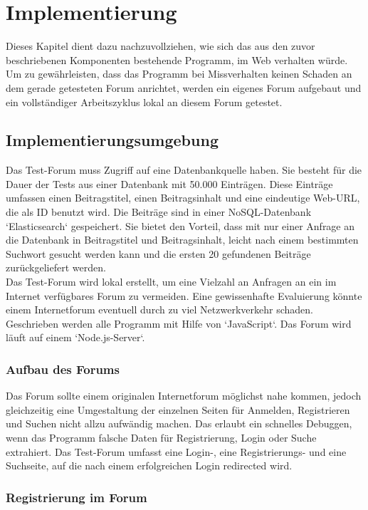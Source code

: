 \section{Implementierung}
Dieses Kapitel dient dazu nachzuvollziehen, wie sich das aus den zuvor beschriebenen Komponenten bestehende Programm, im Web verhalten würde. Um zu gewährleisten, dass das Programm bei Missverhalten keinen Schaden an dem gerade getesteten Forum anrichtet, werden ein eigenes Forum aufgebaut und ein vollständiger Arbeitszyklus lokal an diesem Forum getestet.

\subsection{Implementierungsumgebung}
Das Test-Forum muss Zugriff auf eine Datenbankquelle haben. Sie besteht für die Dauer der Tests aus einer Datenbank mit 50.000 Einträgen. Diese Einträge umfassen einen Beitragstitel, einen Beitragsinhalt und eine eindeutige Web-URL, die als ID benutzt wird. Die Beiträge sind in einer NoSQL-Datenbank `Elasticsearch` gespeichert. Sie bietet den Vorteil, dass mit nur einer Anfrage an die Datenbank in Beitragstitel und Beitragsinhalt, leicht nach einem bestimmten Suchwort gesucht werden kann und die ersten 20 gefundenen Beiträge zurückgeliefert werden.\\
Das Test-Forum wird lokal erstellt, um eine Vielzahl an Anfragen an ein im Internet verfügbares Forum zu vermeiden. Eine gewissenhafte Evaluierung könnte einem Internetforum eventuell durch zu viel Netzwerkverkehr schaden.\\
Geschrieben werden alle Programm mit Hilfe von `JavaScript`. Das Forum wird läuft auf einem `Node.js-Server`. 

\subsubsection{Aufbau des Forums}
Das Forum sollte einem originalen Internetforum möglichst nahe kommen, jedoch gleichzeitig eine Umgestaltung der einzelnen Seiten für Anmelden, Registrieren und Suchen nicht allzu aufwändig machen. Das erlaubt ein schnelles Debuggen, wenn das Programm falsche Daten für Registrierung, Login oder Suche extrahiert. Das Test-Forum umfasst eine Login-, eine Registrierungs- und eine Suchseite, auf die nach einem erfolgreichen Login redirected wird.

\subsubsection{Registrierung im Forum}


